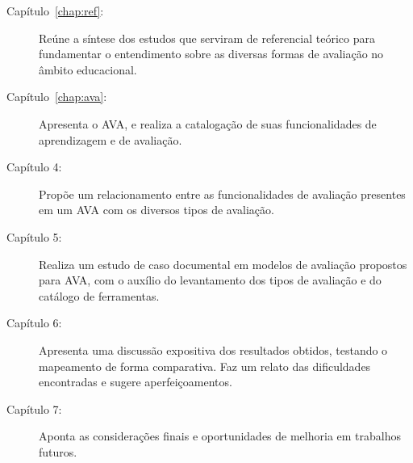 \begin{description}
\item[Capítulo~\ref{chap:ref}:] Reúne a síntese dos estudos que serviram de referencial teórico para fundamentar o entendimento sobre as diversas formas de avaliação no âmbito educacional.
\item[Capítulo~\ref{chap:ava}:] Apresenta o \acrfull{AVA}, e realiza a catalogação de suas funcionalidades de aprendizagem e de avaliação.
\item[Capítulo 4:] Propõe um relacionamento entre as funcionalidades de avaliação presentes em um AVA com os diversos tipos de avaliação.
\item[Capítulo 5:] Realiza um estudo de caso documental em modelos de avaliação propostos para AVA, com o auxílio do levantamento dos tipos de avaliação e do catálogo de ferramentas.
\item[Capítulo 6:] Apresenta uma discussão expositiva dos resultados obtidos, testando o mapeamento de forma comparativa. Faz um relato das dificuldades encontradas e sugere aperfeiçoamentos.
\item[Capítulo 7:] Aponta as considerações finais e oportunidades de melhoria em trabalhos futuros. 
\end{description}


